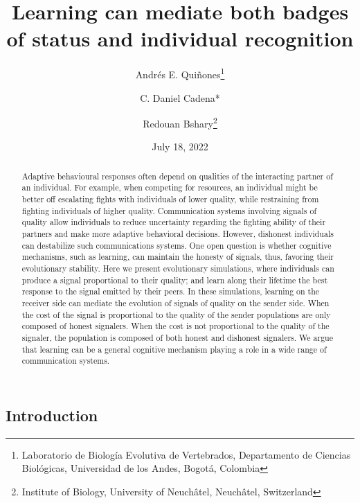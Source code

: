\documentclass[
  12pt,
]{article}
\title{Learning can mediate both badges of status and individual
recognition}
\author{Andrés E. Quiñones\footnote{Laboratorio de Biología Evolutiva de
  Vertebrados, Departamento de Ciencias Biológicas, Universidad de los
  Andes, Bogotá, Colombia} \and C. Daniel Cadena* \and Redouan
Bshary\footnote{Institute of Biology, University of Neuchâtel,
  Neuchâtel, Switzerland}}
\date{July 18, 2022}
\begin{document}
\maketitle
\begin{abstract}
Adaptive behavioural responses often depend on qualities of the
interacting partner of an individual. For example, when competing for
resources, an individual might be better off escalating fights with
individuals of lower quality, while restraining from fighting
individuals of higher quality. Communication systems involving signals
of quality allow individuals to reduce uncertainty regarding the
fighting ability of their partners and make more adaptive behavioral
decisions. However, dishonest individuals can destabilize such
communications systems. One open question is whether cognitive
mechanisms, such as learning, can maintain the honesty of signals, thus,
favoring their evolutionary stability. Here we present evolutionary
simulations, where individuals can produce a signal proportional to
their quality; and learn along their lifetime the best response to the
signal emitted by their peers. In these simulations, learning on the
receiver side can mediate the evolution of signals of quality on the
sender side. When the cost of the signal is proportional to the quality
of the sender populations are only composed of honest signalers. When
the cost is not proportional to the quality of the signaler, the
population is composed of both honest and dishonest signalers. We argue
that learning can be a general cognitive mechanism playing a role in a
wide range of communication systems.
\end{abstract}

\hypertarget{introduction}{%
\subsection{Introduction}\label{introduction}}
\end{document}
